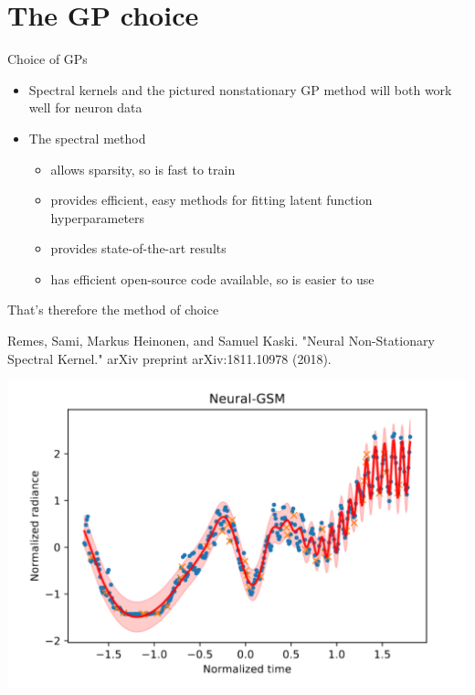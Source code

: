 \documentclass[presentation]{beamer}
\begin{document}
\section{The GP choice}
\label{sec:org56758db}
\begin{frame}[label={sec:org41aeab6}]{Choice of GPs}
\begin{itemize}
\item Spectral kernels and the pictured nonstationary GP method will both work well for neuron data
\item The spectral method
\begin{itemize}
\item allows sparsity, so is fast to train
\item provides efficient, easy methods for fitting latent function hyperparameters
\item provides state-of-the-art results
\item has efficient open-source code available, so is easier to use
\end{itemize}
\end{itemize}

That's therefore the method of choice

\vfill

Remes, Sami, Markus Heinonen, and Samuel Kaski. "Neural Non-Stationary Spectral Kernel." arXiv preprint arXiv:1811.10978 (2018).
\end{frame}

\begin{frame}[plain,label={sec:orgc18fcd8}]{}
\begin{center}
\includegraphics[width=.9\linewidth]{./niceplot.png}
\end{center}
\end{frame}
\end{document}
